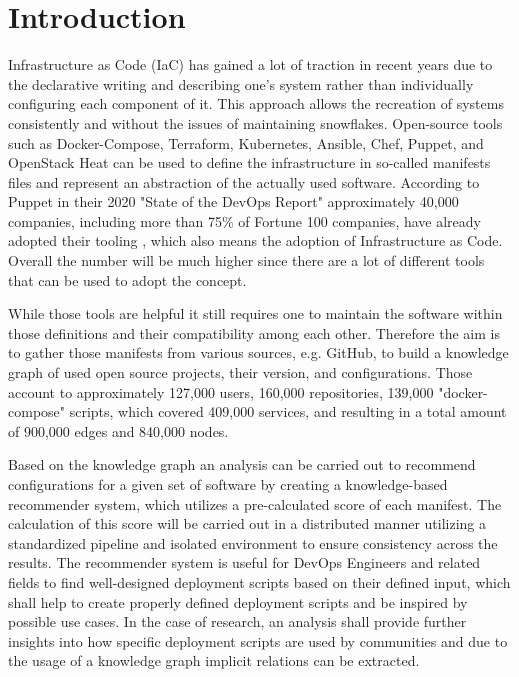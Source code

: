\chapter{Introduction}
Infrastructure as Code (IaC) has gained a lot of traction in recent years due to the declarative writing and describing one's system rather than individually configuring each component of it. This approach allows the recreation of systems consistently and without the issues of maintaining snowflakes. Open-source tools such as Docker-Compose, Terraform, Kubernetes, Ansible, Chef, Puppet, and OpenStack Heat can be used to define the infrastructure in so-called manifests files and represent an abstraction of the actually used software. According to Puppet in their 2020 "State of the DevOps Report" approximately 40,000 companies, including more than 75\% of Fortune 100 companies, have already adopted their tooling \cite{puppet}, which also means the adoption of Infrastructure as Code. Overall the number will be much higher since there are a lot of different tools that can be used to adopt the concept.

While those tools are helpful it still requires one to maintain the software within those definitions and their compatibility among each other.
Therefore the aim is to gather those manifests from various sources, e.g. GitHub, to build a knowledge graph of used open source projects, their version, and configurations. Those account to approximately 127,000 users, 160,000 repositories, 139,000 "docker-compose" scripts, which covered 409,000 services, and resulting in a total amount of 900,000 edges and 840,000 nodes.

Based on the knowledge graph an analysis can be carried out to recommend configurations for a given set of software by creating a knowledge-based recommender system, which utilizes a pre-calculated score of each manifest. The calculation of this score will be carried out in a distributed manner utilizing a standardized pipeline and isolated environment to ensure consistency across the results.
The recommender system is useful for DevOps Engineers and related fields to find well-designed deployment scripts based on their defined input, which shall help to create properly defined deployment scripts and be inspired by possible use cases. In the case of research, an analysis shall provide further insights into how specific deployment scripts are used by communities and due to the usage of a knowledge graph implicit relations can be extracted.

